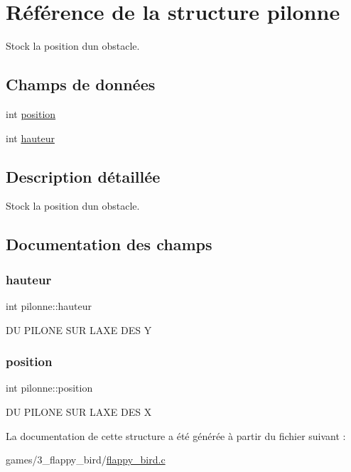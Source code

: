 \hypertarget{structpilonne}{}\section{Référence de la structure pilonne}
\label{structpilonne}


Stock la position d\textquotesingle{}un obstacle.  


\subsection*{Champs de données}
\begin{DoxyCompactItemize}
\item 
int \hyperlink{structpilonne_a8ca897be7553aa68ba57fbb7979af25b}{position}
\item 
int \hyperlink{structpilonne_ad4890f4935655d423dd8f886a58ad228}{hauteur}
\end{DoxyCompactItemize}


\subsection{Description détaillée}
Stock la position d\textquotesingle{}un obstacle. 

\subsection{Documentation des champs}
\mbox{\label{structpilonne_ad4890f4935655d423dd8f886a58ad228}} 
\subsubsection{\texorpdfstring{hauteur}{hauteur}}
{\footnotesize\ttfamily int pilonne\+::hauteur}

DU P\+I\+L\+O\+NE S\+UR L\textquotesingle{}A\+XE D\+ES Y \mbox{\label{structpilonne_a8ca897be7553aa68ba57fbb7979af25b}} 
\subsubsection{\texorpdfstring{position}{position}}
{\footnotesize\ttfamily int pilonne\+::position}

DU P\+I\+L\+O\+NE S\+UR L\textquotesingle{}A\+XE D\+ES X 

La documentation de cette structure a été générée à partir du fichier suivant \+:\begin{DoxyCompactItemize}
\item 
games/3\+\_\+flappy\+\_\+bird/\hyperlink{flappy__bird_8c}{flappy\+\_\+bird.\+c}\end{DoxyCompactItemize}
